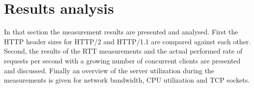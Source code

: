 \section{Results analysis}
\label{sec:results}
In that section the measurement results are presented and analysed. First the HTTP header sizes for HTTP/2 and HTTP/1.1 are compared against each other. Second, the results of the RTT measurements and the actual performed rate of requests per second with a growing number of concurrent clients are presented and discussed. Finally an overview of the server utilization during the measurements is given for network bandwidth, CPU utilization and TCP sockets.  